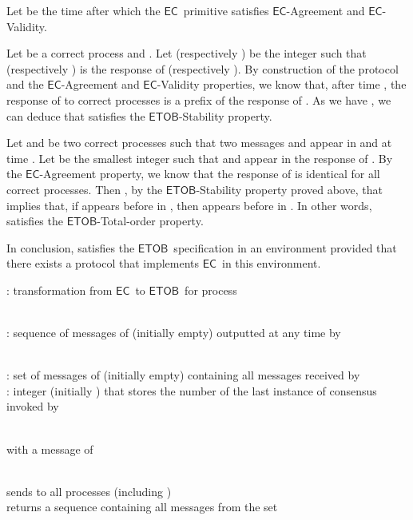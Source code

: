 \documentclass[11pt]{article}
\newcommand{\EC}{\ensuremath{\mathsf{EC}}}
\newcommand{\ETOB}{\ensuremath{\mathsf{ETOB}}}
\begin{document}
{Let  be the time after which the \EC~primitive satisfies \EC-Agreement and \EC-Validity.

Let  be a correct process and . Let  (respectively ) be the integer such that  (respectively ) is the response of  (respectively ). By construction of the protocol and the \EC-Agreement and \EC-Validity properties, we know that, after time , the response of  to correct processes is a prefix of the response of . As we have , we can deduce that  satisfies the \ETOB-Stability property.

Let  and  be two correct processes such that two messages  and  appear in  and  at time . Let  be the smallest integer such that  and  appear in the response of . By the \EC-Agreement property, we know that the response of  is identical for all correct processes. Then , by the \ETOB-Stability property proved above, that implies that, if  appears before  in , then  appears before  in . In other words,  satisfies the \ETOB-Total-order property.

In conclusion,  satisfies the \ETOB~specification in an environment  provided that there exists a protocol that implements \EC~in this environment.

\begin{algorithm}
\caption{: transformation from \EC~to \ETOB~for process }\label{algo:ECtoETOB}
\small
\begin{description}\itemsep0pt
\item[Output variable:]~\\
: sequence of messages of  (initially empty) outputted at any time by 

\item[Internal variables:]~\\
: set of messages of  (initially empty) containing all messages received by ~\\
: integer (initially ) that stores the number of the last instance of consensus invoked by 

\item[Messages:]~\\
  with  a message of 

\item[Functions:]~\\
 sends  to all processes (including )\\
 returns a sequence containing all messages from the set 

\item[On reception of  from the application]~\\



\end{description}
\end{algorithm}}
\end{document}
